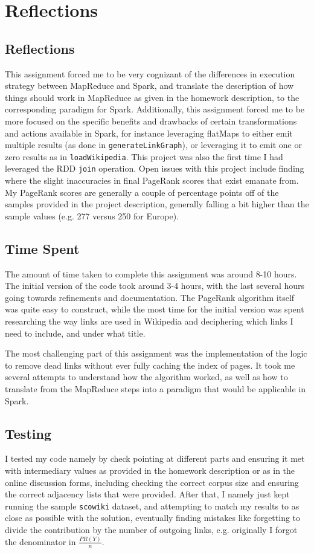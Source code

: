 \documentclass{article}
\begin{document}
\section{Reflections}
\subsection{Reflections}
This assignment forced me to be very cognizant of the differences in execution strategy between MapReduce and Spark, and translate the description of how things should work in MapReduce as given in the homework description, to the corresponding paradigm for Spark.
Additionally, this assignment forced me to be more focused on the specific benefits and drawbacks of certain transformations and actions available in Spark, for instance leveraging flatMaps to either emit multiple results (as done in \texttt{generateLinkGraph}), or leveraging it to emit one or zero results as in \texttt{loadWikipedia}.
This project was also the first time I had leveraged the RDD \texttt{join} operation.
Open issues with this project include finding where the slight inaccuracies in final PageRank scores that exist emanate from. My PageRank scores are generally a couple of percentage points off of the samples provided in the project description, generally falling a bit higher than the sample values (e.g. 277 versus 250 for Europe).
\subsection{Time Spent}
The amount of time taken to complete this assignment was around 8-10 hours. The initial version of the code took around 3-4 hours, with the last several hours going towards refinements and documentation. The PageRank algorithm itself was quite easy to construct, while the most time for the initial version was spent researching the way links are used in Wikipedia and deciphering which links I need to include, and under what title.

The most challenging part of this assignment was the implementation of the logic to remove dead links without ever fully caching the index of pages.
It took me several attempts to understand how the algorithm worked, as well as how to translate from the MapReduce steps into a paradigm that would be applicable in Spark.

\subsection{Testing}
I tested my code namely by check pointing at different parts and ensuring it met with intermediary values as provided in the homework description or as in the online discussion forms, including checking the correct corpus size and ensuring the correct adjacency lists that were provided.
After that, I namely just kept running the sample \texttt{scowiki} dataset, and attempting to match my results to as close as possible with the solution, eventually finding mistakes like forgetting to divide the contribution by the number of outgoing links, e.g. originally I forgot the denominator in $\frac{PR(Y)}{n}$.
\end{document}
